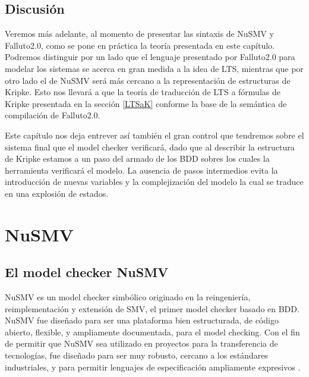 \documentclass[titlepage, 12pt]{book}
\begin{document}
\section{Discusi\'on}
Veremos m\'as adelante, al momento de presentar las sintaxis de NuSMV y Falluto2.0, como se pone en pr\'actica la teor\'ia presentada en este cap\'itulo. Podremos distinguir por un lado que el lenguaje presentado por Falluto2.0 para modelar los sistemas se acerca en gran medida a la idea de LTS, mientras que por otro lado el de NuSMV ser\'a m\'as cercano a la representaci\'on de estructuras de Kripke. Esto nos llevar\'a a que la teor\'ia de traducci\'on de LTS a f\'ormulas de Kripke presentada en la secci\'on \ref{LTSaK} conforme la base de la sem\'antica de compilaci\'on de Falluto2.0.
 
Este cap\'itulo nos deja entrever as\'i tambi\'en el gran control que tendremos sobre el sistema final que el model checker verificar\'a, dado que al describir la estructura de Kripke estamos a un paso del armado de los BDD sobres los cuales la herramienta verificar\'a el modelo. La ausencia de pasos intermedios evita la introducci\'on de nuevas variables y la complejizaci\'on del modelo la cual se traduce en una explosi\'on de estados.







\chapter{NuSMV}
\label{CapNuSMV}
\section{El model checker NuSMV}

NuSMV es un model checker simb\'olico originado en la reingenier\'ia, reimplementaci\'on y extensi\'on de SMV, el primer model checker basado en BDD. NuSMV fue dise\~nado para ser una plataforma bien estructurada, de c\'odigo abierto, flexible, y ampliamente documentada, para el model checking. Con el fin de permitir que NuSMV sea utilizado en proyectos para la transferencia de tecnolog\'ias, fue dise\~nado para ser muy robusto, cercano a los est\'andares industriales, y para permitir lenguajes de especificaci\'on ampliamente expresivos \cite{Cimatti}.
\end{document}
